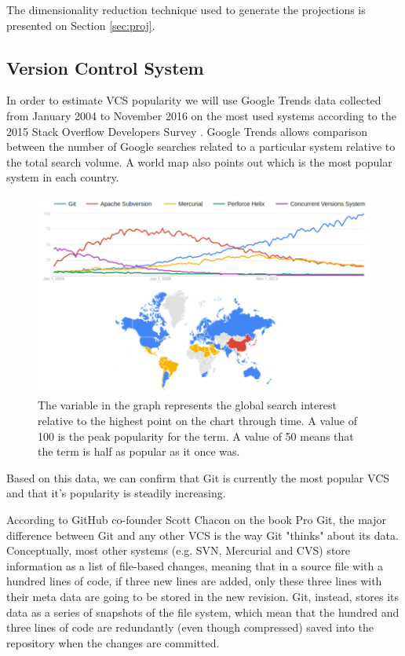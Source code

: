 The dimensionality reduction technique used to generate the projections is presented on Section \ref{sec:proj}.

\subsection{Version Control System} \label{sec:git}

In order to estimate VCS popularity we will use Google Trends data collected from January 2004 to November 2016 on the most used systems according to the 2015 Stack Overflow Developers Survey \cite{ref:stackoverflow}. Google Trends allows comparison between the number of Google searches related to a particular system relative to the total search volume. A world map also points out which is the most popular system in each country.

\begin{figure}[H]
  \centering
  \includegraphics[width=\textwidth]{figures/vcs_pop.png}
  \caption{The variable in the graph represents the global search interest relative to the highest point on the chart through time. A value of 100 is the peak popularity for the term. A value of 50 means that the term is half as popular as it once was.}
  \label{fig:vcs_pop}
\end{figure}

Based on this data, we can confirm that Git is currently the most popular VCS and that it's popularity is steadily increasing.

According to GitHub co-founder Scott Chacon on the book Pro Git\cite{ref:progit}, the major difference between Git and any other VCS is the way Git "thinks" about its data. Conceptually, most other systems (e.g. SVN, Mercurial and CVS) store information as a list of file-based changes, meaning that in a source file with a hundred lines of code, if three new lines are added, only these three lines with their meta data are going to be stored in the new revision. Git, instead, stores its data as a series of snapshots of the file system, which mean that the hundred and three lines of code are redundantly (even though compressed) saved into the repository when the changes are committed.

